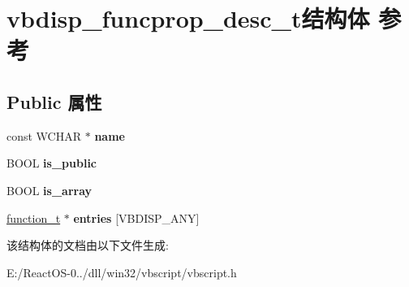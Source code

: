 \hypertarget{structvbdisp__funcprop__desc__t}{}\section{vbdisp\+\_\+funcprop\+\_\+desc\+\_\+t结构体 参考}
\label{structvbdisp__funcprop__desc__t}
\subsection*{Public 属性}
\begin{DoxyCompactItemize}
\item 
\mbox{\label{structvbdisp__funcprop__desc__t_a1d31e4bb0e2f2b2ffbcca3765354a0a8}} 
const W\+C\+H\+AR $\ast$ {\bfseries name}
\item 
\mbox{\label{structvbdisp__funcprop__desc__t_a3e9c531a3476717eb7d4dd2e8c1e883b}} 
B\+O\+OL {\bfseries is\+\_\+public}
\item 
\mbox{\label{structvbdisp__funcprop__desc__t_a287441be45f6e49938c8dd56644ff5ae}} 
B\+O\+OL {\bfseries is\+\_\+array}
\item 
\mbox{\label{structvbdisp__funcprop__desc__t_abd973ba6fe23a75a414348e7e13e0b66}} 
\hyperlink{struct__function__t}{function\+\_\+t} $\ast$ {\bfseries entries} \mbox{[}V\+B\+D\+I\+S\+P\+\_\+\+A\+NY\mbox{]}
\end{DoxyCompactItemize}


该结构体的文档由以下文件生成\+:\begin{DoxyCompactItemize}
\item 
E\+:/\+React\+O\+S-\/0../dll/win32/vbscript/vbscript.\+h\end{DoxyCompactItemize}
